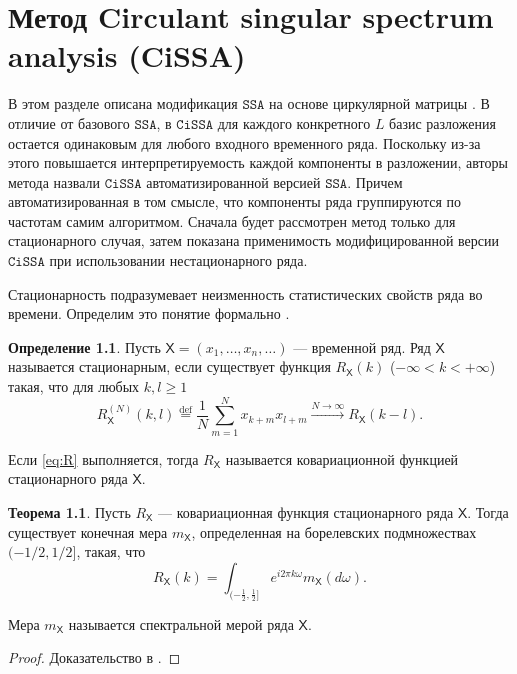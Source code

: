 \documentclass[12pt, specialist, subf
]{disser}
\theoremstyle{definition}
\newcommand{\SSA}{\texttt{SSA}}
\newcommand{\CISSA}{\texttt{CiSSA}}
\newcommand{\TS}{\mathsf{X}}
\newtheorem{definition}{Определение} %
\newtheorem{theorem}{Теорема} %
\begin{document}
\newpage






\chapter{Метод Circulant singular spectrum analysis (CiSSA)}
\label{sec:cissa}


В этом разделе описана модификация $\SSA$ на основе циркулярной матрицы \cite{bogalo2020}. В отличие от базового $\SSA$, в $\CISSA$ для каждого конкретного $L$ базис разложения остается одинаковым для любого входного временного ряда. Поскольку из-за этого повышается интерпретируемость каждой компоненты в разложении, авторы метода назвали $\CISSA$ автоматизированной версией $\SSA$. Причем автоматизированная в том смысле, что компоненты ряда группируются по частотам самим алгоритмом. Сначала будет рассмотрен метод только для стационарного случая, затем показана применимость модифицированной версии $\CISSA$ при использовании нестационарного ряда.

Стационарность подразумевает неизменность статистических свойств ряда во времени. Определим это понятие формально \cite{golyandina2001analysis}.
\begin{definition}
	Пусть $\TS = (x_1, \dots, x_n, \dots)$ — временной ряд. Ряд $\TS$ называется стационарным, если существует функция $R_{\TS}(k)$ ($-\infty < k < +\infty$) такая, что для любых $k, l \geq 1$
	\begin{equation}
		R_{\TS}^{(N)}(k, l) \overset{\mathrm{def}}{=} \frac{1}{N} \sum_{m=1}^{N} x_{k+m} x_{l+m} \xrightarrow{N \to \infty} R_{\TS}(k - l). \label{eq:R}
	\end{equation}

	Если \eqref{eq:R} выполняется, тогда $R_{\TS}$ называется ковариационной функцией стационарного ряда $\TS$.
\end{definition}

\begin{theorem}
	Пусть $R_{\TS}$ — ковариационная функция стационарного ряда $\TS$. Тогда существует конечная мера $m_{\TS}$, определенная на борелевских подмножествах $(-1/2, 1/2]$, такая, что
	\[
		R_{\TS}(k) = \int_{(-\frac{1}{2}, \frac{1}{2}]} e^{i 2 \pi k \omega} m_{\TS}(d\omega).
	\]


	Мера $m_{\TS}$ называется спектральной мерой ряда $\TS$.
\end{theorem}
\begin{proof}
	Доказательство в \cite{golyandina2001analysis}.
\end{proof}
\end{document}
